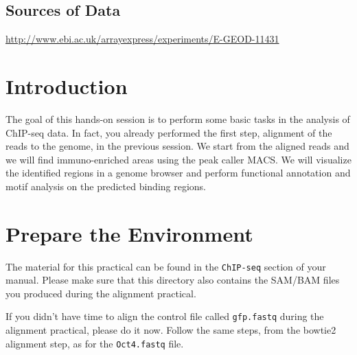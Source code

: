 \subsection{Sources of Data}
  \url{http://www.ebi.ac.uk/arrayexpress/experiments/E-GEOD-11431}


\newpage

\section{Introduction}

\begin{information}
The goal of this hands-on session is to perform some basic tasks in the analysis
of ChIP-seq data. In fact, you already performed the first step, alignment of
the reads to the genome, in the previous session. We start from the aligned
reads and we will find immuno-enriched areas using the peak caller MACS. We will
visualize the identified regions in a genome browser and perform functional
annotation and motif analysis on the predicted binding regions.
\end{information}

\section{Prepare the Environment}

\begin{information}
The material for this practical can be found in the \texttt{ChIP-seq} section of your manual.
Please make sure that this directory also contains the SAM/BAM files you produced during the alignment
practical.
\end{information}

\begin{steps}
If you didn't have time to align the control file called \texttt{gfp.fastq}
during the alignment practical, please do it now. Follow the same steps, from
the bowtie2 alignment step, as for the \texttt{Oct4.fastq} file.
\end{steps}


